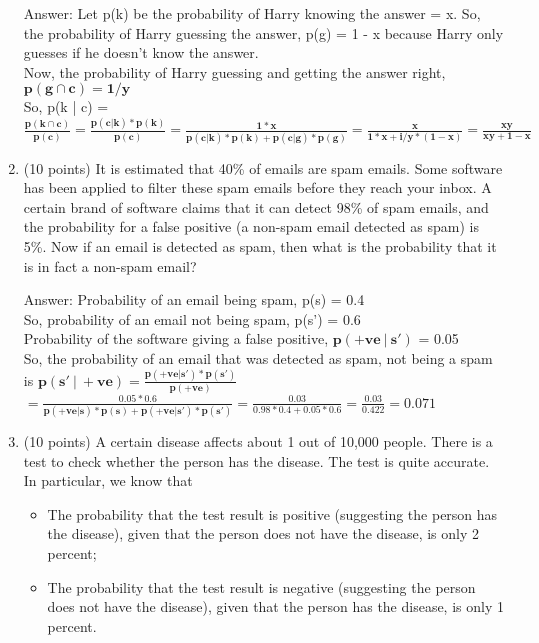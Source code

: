 \documentclass{article}%
\begin{document}
\begin{enumerate}
    Answer: Let p(k) be the probability of Harry knowing the answer = x. So, the probability of Harry guessing the answer, p(g) = 1 - x because Harry only guesses if he doesn't know the answer. \\
    Now, the probability of Harry guessing and getting the answer right, $\mathbf{ p(g \cap c) = 1 / y}$ \\
    So, p(k | c) = $\mathbf{ \frac{p(k \cap c)}{p(c)} = \frac{p(c | k) * p(k)}{p(c)} = \frac{1 * x}{p(c | k) * p(k) + p(c | g) * p(g)} = \frac{x}{1 * x + i/y * (1-x)} = \frac{xy}{xy + 1 - x} }$
    
    \item (10 points) It is estimated that 40\% of emails are spam emails. Some software has been applied to filter these spam emails before they reach your inbox. A certain brand of software claims that it can detect 98\% of spam emails, and the probability for a false positive (a non-spam email detected as spam) is 5\%. Now if an email is detected as spam, then what is the probability that it is in fact a non-spam email?
    
    Answer: Probability of an email being spam, p(s) = 0.4 \\ 
    So, probability of an email not being spam, p(s') = 0.6 \\
    Probability of the software giving a false positive, $\mathbf{ p(+ve \ | \ s') }$ = 0.05 \\
    So, the probability of an email that was detected as spam, not being a spam is $\mathbf{ p(s' \ | \ +ve) = \frac{p(+ve | s') * p(s')}{p(+ve)} }$ \\
    $\mathbf{ = \frac{0.05 * 0.6}{p(+ve|s) * p(s) + p(+ve|s') * p(s')} = \frac{0.03}{0.98 * 0.4 + 0.05 * 0.6} = \frac{0.03}{0.422} = 0.071 }$

    \item (10 points) A  certain  disease  affects  about 1 out  of 10,000  people.  There  is  a  test  to  check whether the person has the disease. The test is quite accurate. In particular, we know that

    \begin{itemize}
        \item The probability that the test result is positive  (suggesting the person has the disease), given that the person does not have the disease, is only 2 percent; 
        \item The probability that the test result is negative (suggesting the person does not have the disease), given that the person has the disease, is only 1 percent. 
    \end{itemize}


\end{enumerate}
\end{document}
